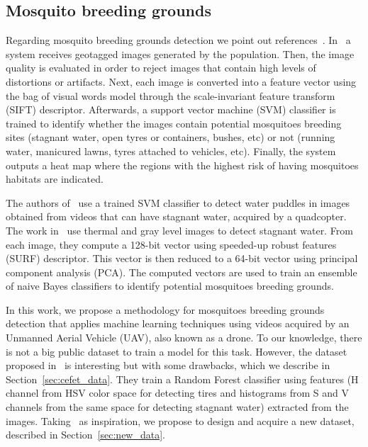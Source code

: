 \subsection{Mosquito breeding grounds}
%
Regarding mosquito breeding grounds detection we point out references~\cite{Agarwal2014a, Prasad2015a, Mehra2016a}.
%
In~\cite{Agarwal2014a} a system receives geotagged images generated by the population.
Then, the image quality is evaluated in order to reject images that contain high levels of distortions or artifacts.
Next, each image is converted into a feature vector using the bag of visual words model through
the scale-invariant feature transform (SIFT) descriptor.
Afterwards, a support vector machine (SVM) classifier is trained to identify whether the
images contain potential mosquitoes breeding sites (stagnant water, open tyres or containers, bushes, etc) or not (running water, manicured lawns, tyres attached to vehicles, etc).
Finally, the system outputs a heat map where the regions with the highest risk of having mosquitoes habitats are indicated.
%

The authors of~\cite{Prasad2015a} use a trained SVM classifier to detect water puddles in images obtained from videos that can have stagnant water, acquired by a quadcopter.
%
The work in~\cite{Mehra2016a} use thermal and gray level images to detect stagnant water.
From each image, they compute a 128-bit vector using speeded-up robust features (SURF)
descriptor.
This vector is then reduced to a 64-bit vector using principal component analysis (PCA).
The computed vectors are used to train an ensemble of naive Bayes classifiers to identify potential mosquitoes breeding grounds.

In this work, we propose a methodology for mosquitoes breeding grounds detection that applies machine learning techniques using videos acquired by an Unmanned Aerial Vehicle (UAV), also known as a drone.
%
To our knowledge, there is not a big public dataset to train a model for this task.
However, the dataset proposed in~\cite{casfinal2018} is interesting but with some drawbacks, which we describe in Section~\ref{sec:cefet_data}.
They train a Random Forest classifier using features (H channel from HSV  color  space for detecting tires and histograms from S and V channels from the same space for detecting stagnant water) extracted from the images.
Taking~\cite{casfinal2018} as inspiration, we propose to design and acquire a new dataset, described in Section~\ref{sec:new_data}.

